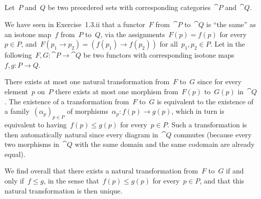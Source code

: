 \subsection{}

Let~$P$ and~$Q$ be two preordered sets with corresponding categories~$\cat{P}$ and~$\cat{Q}$.

We have seen in Exercise~1.3.ii that a functor~$F$ from~$\cat{P}$ to~$\cat{Q}$ is \enquote{the same} as an isotone map~$f$ from~$P$ to~$Q$, via the assignments~$F(p) = f(p)$ for every~$p ∈ P$, and~$F(p_1 \to p_2) = (f(p_1) \to f(p_2))$ for all~$p_1, p_2 ∈ P$.
Let in the following~$F, G \colon \cat{P} \to \cat{Q}$ be two functors with corresponding isotone maps~$f, g \colon P \to Q$.

There exists at most one natural transformation from~$F$ to~$G$ since for every element~$p$ on~$P$ there exists at most one morphism from~$F(p)$ to~$G(p)$ in~$\cat{Q}$.
The existence of a transformation from~$F$ to~$G$ is equivalent to the existence of a family~$(α_p)_{p ∈ P}$ of morphisms~$α_p \colon f(p) \to g(p)$, which in turn is equivalent to having~$f(p) ≤ g(p)$ for every~$p ∈ P$.
Such a transformation is then automatically natural since every diagram in~$\cat{Q}$ commutes (because every two morphisms in~$\cat{Q}$ with the same domain and the same codomain are already equal).

We find overall that there exists a natural transformation from~$F$ to~$G$ if and only if~$f ≤ g$, in the sense that~$f(p) ≤ g(p)$ for every~$p ∈ P$, and that this natural transformation is then unique.
